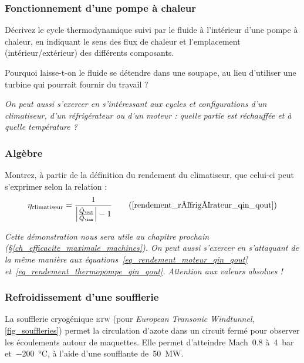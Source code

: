 \subsubsection{Fonctionnement d’une pompe à chaleur}
\label{exo_fonctionnement_thermopompe}

	Décrivez le cycle thermodynamique suivi par le fluide à l’intérieur d’une pompe à chaleur, en indiquant le sens des flux de chaleur et l’emplacement (intérieur/extérieur) des différents composants.
	
	Pourquoi laisse-t-on le fluide se détendre dans une soupape, au lieu d’utiliser une turbine qui pourrait fournir du travail ?
	
	\textit{On peut aussi s’exercer en s’intéressant aux cycles et configurations d’un climatiseur, d’un réfrigérateur ou d’un moteur : quelle partie est réchauffée et à quelle température ?}


\subsubsection{Algèbre}
\label{exo_algebre_rendement_climatiseur}

	Montrez, à partir de la définition du rendement du climatiseur, que celui-ci peut s’exprimer selon la relation :
			\begin{equation}
				\eta_\text{climatiseur} = \frac{1}{\left| \frac{\dot Q_\out}{\dot Q_\inn} \right| - 1} \tag{\ref{rendement_réfrigérateur_qin_qout}}
			\end{equation}
	
	\textit{Cette démonstration nous sera utile au chapitre prochain (\S\ref{ch_efficacite_maximale_machines}). On peut aussi s’exercer en s’attaquant de la même manière aux équations~\ref{eq_rendement_moteur_qin_qout} et~\ref{eq_rendement_thermopompe_qin_qout}. Attention aux valeurs absolues !}
	
	
\subsubsection{Refroidissement d’une soufflerie}
\label{exo_refrigeration_soufflerie}

	La soufflerie cryogénique \textsc{etw} (pour \textit{European Transonic Windtunnel}, \cref{fig_souffleries}) permet la circulation d’azote dans un circuit fermé pour observer les écoulements autour de maquettes. Elle permet d’atteindre Mach~\num{0,8} à~\SI{4}{\bar} et~\SI{-200}{\celsius}, à l’aide d’une soufflante de~\SI{50}{\mega\watt}.
	
